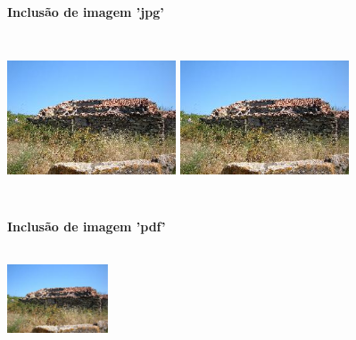 \documentclass[a4paper,12pt]{article}
\begin{document}
\break

\vskip 20mm
\centerline{\Large\bf Inclusão de imagem 'jpg'}
\par\vskip 5mm
\includegraphics[width=5cm,height=5cm]{dscf1683b_v1.jpg}
\hskip 20mm
\includegraphics[width=5cm,height=5cm,keepaspectratio]{dscf1683b_v1.jpg}

\vskip 20mm
\centerline{\Large\bf Inclusão de imagem 'pdf'}
\par\vskip 5mm
\includegraphics[width=3cm,height=3cm,keepaspectratio]{dscf1683b_v1.pdf}
\end{document}
